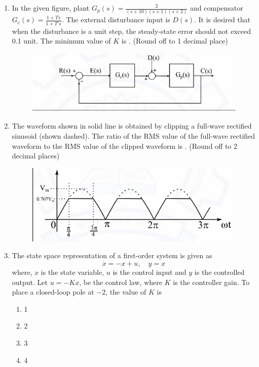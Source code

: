 \documentclass[journal,12pt,onecolumn]{IEEEtran}
\theoremstyle{remark}
\begin{document}
\begin{flushleft}
\begin{enumerate}
\item In the given figure, plant $G_p(s) = \frac{2}{(s+10)(s+1)(s+2)}$ and 
compensator $G_c(s) = \frac{1+Ts}{1+T's}$. The external disturbance input is $D(s)$.  
It is desired that when the disturbance is a unit step, the steady-state error should 
not exceed 0.1 unit. The minimum value of $K$ is . (Round off to 1 decimal place)
\begin{figure}[H]
    \centering
    \includegraphics[width=0.5\columnwidth]{figs/57.png}
    \caption{}
    \label{fig:placeholder}
\end{figure}

\item The waveform shown in solid line is obtained by clipping a full-wave 
rectified sinusoid (shown dashed). The ratio of the RMS value of the full-wave 
rectified waveform to the RMS value of the clipped waveform is .  
(Round off to 2 decimal places)
\begin{figure}[H]
    \centering
    \includegraphics[width=0.5\columnwidth]{figs/58.png}
    \caption{}
    \label{fig:placeholder}
\end{figure}



\item The state space representation of a first-order system is given as
\[
\dot{x} = -x + u, \quad y = x
\]
where, $x$ is the state variable, $u$ is the control input and $y$ is the controlled output. Let $u = -Kx$, be the control law, where $K$ is the controller gain. To place a closed-loop pole at $-2$, the value of $K$ is

\begin{multicols}{2}
\begin{enumerate}
\item 1  
\item 2  
\item 3  
\item 4  
\end{enumerate}
\end{multicols}



\end{enumerate}
\end{flushleft}
\end{document}
